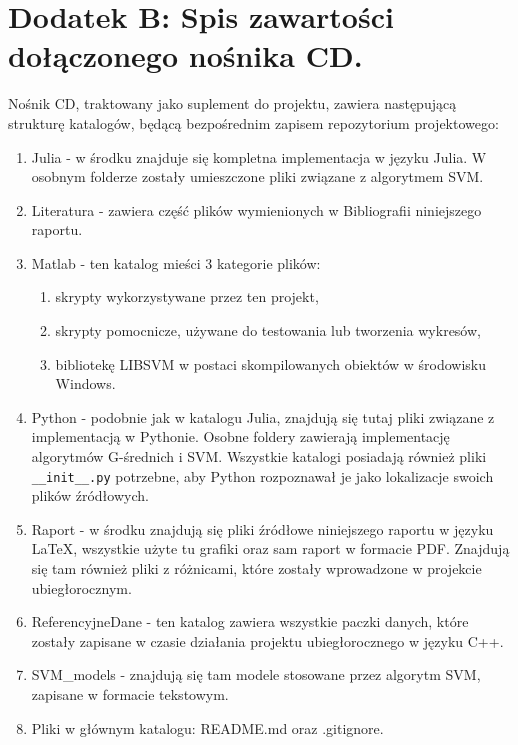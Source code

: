 \section*{Dodatek B: Spis zawartości dołączonego nośnika CD.}
\label{dodatekB}

\qquad Nośnik CD, traktowany jako suplement do projektu, zawiera następującą strukturę katalogów, będącą bezpośrednim zapisem repozytorium projektowego: 

\begin{enumerate}
	\item Julia - w środku znajduje się kompletna implementacja w języku Julia. W osobnym folderze zostały umieszczone pliki związane z algorytmem SVM.
	\item Literatura - zawiera część plików wymienionych w Bibliografii niniejszego raportu.
	\item Matlab - ten katalog mieści 3 kategorie plików:
	\begin{enumerate}
		\item skrypty wykorzystywane przez ten projekt,
		\item skrypty pomocnicze, używane do testowania lub tworzenia wykresów,
		\item bibliotekę LIBSVM w postaci skompilowanych obiektów w środowisku Windows.
	\end{enumerate}
	\item Python - podobnie jak w katalogu Julia, znajdują się tutaj pliki związane z implementacją w Pythonie. Osobne foldery zawierają implementację algorytmów G-średnich i SVM. Wszystkie katalogi posiadają również pliki \texttt{\_\_init\_\_.py} potrzebne, aby Python rozpoznawał je jako lokalizacje swoich plików źródłowych.
	\item Raport - w środku znajdują się pliki źródłowe niniejszego raportu w języku LaTeX, wszystkie użyte tu grafiki oraz sam raport w formacie PDF. Znajdują się tam również pliki z różnicami, które zostały wprowadzone w projekcie ubiegłorocznym.
	\item ReferencyjneDane - ten katalog zawiera wszystkie paczki danych, które zostały zapisane w czasie działania projektu ubiegłorocznego w języku C++.
	\item SVM\_models - znajdują się tam modele stosowane przez algorytm SVM, zapisane w formacie tekstowym.
	\item Pliki w głównym katalogu: README.md oraz .gitignore.
\end{enumerate}